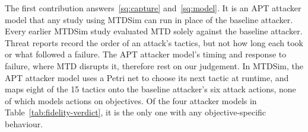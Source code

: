 \documentclass{cshonours}
\begin{document}
The first contribution answers~\ref{sq:capture}
and~\ref{sq:model}. It is an APT attacker model that any study using MTDSim
can run in place of the baseline attacker. Every earlier MTDSim study evaluated MTD solely against
the baseline attacker. Threat reports record the order of an attack's
tactics, but not how long each took or what followed a failure. The APT
attacker model's timing and response to failure, where MTD disrupts it, therefore rest
on our judgement. In MTDSim, the APT attacker model uses a Petri net to choose
its next tactic at runtime, and maps eight of the 15 tactics onto the baseline
attacker's six attack actions, none of which models actions on objectives. Of
the four attacker models in Table~\ref{tab:fidelity-verdict}, it is the only
one with any objective-specific behaviour.
\end{document}

